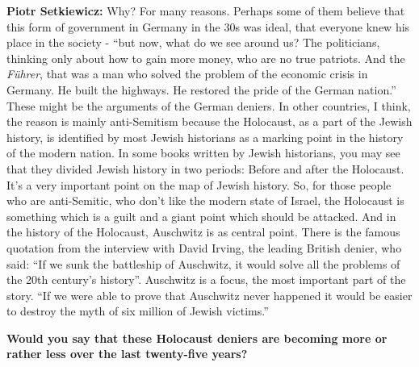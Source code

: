 \textbf{Piotr Setkiewicz:} Why? For many reasons. Perhaps some of them believe that this form of government in Germany in the 30s was ideal, that everyone knew his place in the society - ``but now, what do we see around us? The politicians, thinking only about how to gain more money, who are no true patriots. And the \textit{Führer}, that was a man who solved the problem of the economic crisis in Germany. He built the highways. He restored the pride of the German nation.'' These might be the arguments of the German deniers. In other countries, I think, the reason is mainly anti-Semitism because the Holocaust, as a part of the Jewish history, is identified by most Jewish historians as a marking point in the history of the modern nation. In some books written by Jewish historians, you may see that they divided Jewish history in two periods: Before and after the Holocaust. It’s a very important point on the map of Jewish history. So, for those people who are anti-Semitic, who don’t like the modern state of Israel, the Holocaust is something which is a guilt and a giant point which should be attacked. And in the history of the Holocaust, Auschwitz is as central point. There is the famous quotation from the interview with David Irving, the leading British denier, who said: ``If we sunk the battleship of Auschwitz, it would solve all the problems of the 20th century’s history''. Auschwitz is a focus, the most important part of the story. ``If we were able to prove that Auschwitz never happened it would be easier to destroy the myth of six million of Jewish victims.''

\textbf{Would you say that these Holocaust deniers are becoming more or rather less over the last twenty-five years?}

